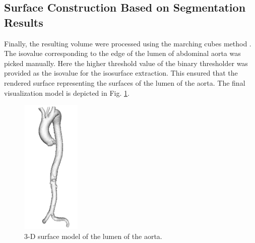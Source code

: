 \subsection{Surface Construction Based on Segmentation Results}
Finally, the resulting volume were processed using the marching cubes method \cite{Lorensen1987MC}.
The isovalue corresponding to the edge of the lumen of abdominal aorta was picked manually.
Here the higher threshold value of the binary thresholder was provided as the isovalue for the isosurface extraction.
This ensured that the rendered surface representing the surfaces of the lumen of the aorta.
The final visualization model is depicted in Fig. \ref{fig:VisualizationModel}.
\begin{figure}[t]
\centering
\includegraphics[width=1.1in]{Figures/chap03/model.png}
\caption{3-D surface model of the lumen of the aorta.}
\label{fig:VisualizationModel}
\end{figure} 